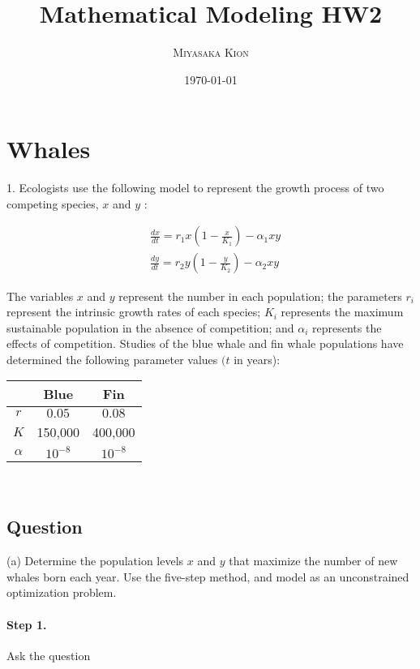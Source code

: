 \documentclass[11pt]{article}
\title{\textbf{Mathematical Modeling HW2}}
\author{\textsc{Miyasaka Kion}}
\date{\today}
\begin{document}
	
\maketitle



\section{Whales}
1. Ecologists use the following model to represent the growth process of two competing species, $x$ and $y$ :

$$
\begin{aligned}
&\frac{d x}{d t}=r_{1} x\left(1-\frac{x}{K_{1}}\right)-\alpha_{1} x y \\
&\frac{d y}{d t}=r_{2} y\left(1-\frac{y}{K_{2}}\right)-\alpha_{2} x y
\end{aligned}
$$

The variables $x$ and $y$ represent the number in each population; the parameters $r_{i}$ represent the intrinsic growth rates of each species; $K_{i}$ represents the maximum sustainable population in the absence of competition; and $\alpha_{i}$ represents the effects of competition. Studies of the blue whale and fin whale populations have determined the following parameter values $(t$ in years): 
\begin{center}
\begin{tabular}{ccc}
\hline & Blue & Fin \\
\hline$r$ & $0.05$ & $0.08$ \\
$K$ & 150,000 & 400,000 \\
$\alpha$ & $10^{-8}$ & $10^{-8}$ \\
\hline
\end{tabular}\\
\end{center}
\subsection{Question}
(a) Determine the population levels $x$ and $y$ that maximize the number of new whales born each year. Use the five-step method, and model as an unconstrained optimization problem.\\
\paragraph{Step 1.} Ask the question\\
\end{document}
